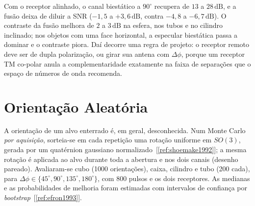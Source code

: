 \documentclass[12pt,a4paper,oneside]{book}
\theoremstyle{remark}
\newcommand{\dB}{\,\mathrm{dB}}
\newcommand{\citar}[1]{[\ref{ref:#1}]}
\theoremstyle{plain}
\theoremstyle{definition}
\begin{document}
Com o receptor alinhado, o canal biestático a $90^\circ$ recupera de $13$ a
$28\dB$, e a fusão deixa de diluir a SNR ($-1,5$ a $+3,6\dB$, contra $-4,8$ a
$-6,7\dB$). O contraste da fusão melhora de $2$ a $3\dB$ na esfera, nos tubos e no
cilindro inclinado; nos objetos com uma face horizontal, a especular biestática
passa a dominar e o contraste piora. Daí decorre uma regra de projeto: o receptor
remoto deve ser de dupla polarização, ou girar sua antena com $\Delta\phi$, porque um
receptor TM co-polar anula a complementaridade exatamente na faixa de
separações que o espaço de números de onda recomenda.

\section{Orientação Aleatória}
\label{sec:alv_montecarlo}

A orientação de um alvo enterrado é, em geral, desconhecida. Num Monte Carlo
\emph{por aquisição}, sorteia-se em cada repetição uma rotação uniforme em
$SO(3)$, gerada por um quatérnion gaussiano normalizado~\citar{shoemake1992};
a mesma rotação é aplicada ao alvo durante toda a abertura e nos dois canais
(desenho pareado). Avaliaram-se cubo (1000 orientações), caixa, cilindro e tubo
(200 cada), para $\Delta\phi\in\{45^\circ,90^\circ,135^\circ,180^\circ\}$, com
800 pulsos e os dois receptores. As medianas e as probabilidades de melhoria
foram estimadas com intervalos de confiança por \textit{bootstrap}~\citar{efron1993}.
\end{document}
